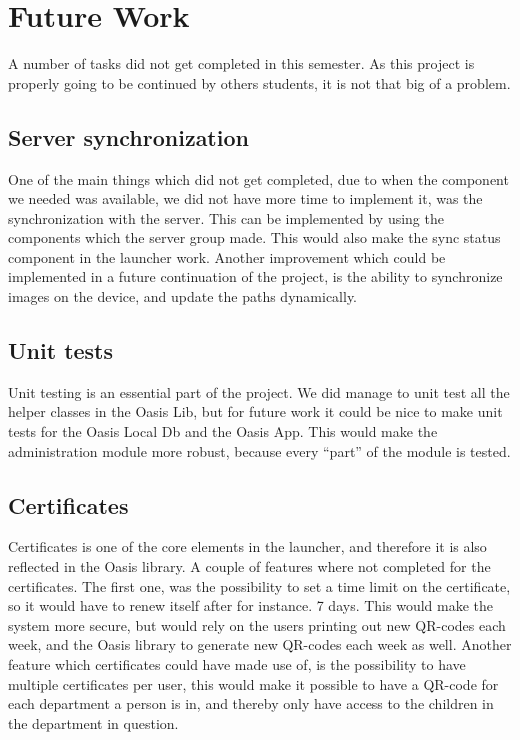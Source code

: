 \section{Future Work}

A number of tasks did not get completed in this semester. As this project is properly going to be continued by others students, it is not that big of a problem. 

\subsection{Server synchronization}
One of the main things which did not get completed, due to when the component we needed was available, we did not have more time to implement it, was the synchronization with the server. This can be implemented by using the components which the server group made. This would also make the sync status component in the launcher work.
Another improvement which could be implemented in a future continuation of the project, is the ability to synchronize images on the device, and update the paths dynamically.

\subsection{Unit tests}
Unit testing is an essential part of the project. We did manage to unit test all the helper classes in the Oasis Lib, but for future work it could be nice to make unit tests for the Oasis Local Db and the Oasis App. This would make the administration module more robust, because every "`part"' of the module is tested.

\subsection{Certificates}
Certificates is one of the core elements in the launcher, and therefore it is also reflected in the Oasis library. A couple of features where not completed for the certificates. The first one, was the possibility to set a time limit on the certificate, so it would have to renew itself after for instance. 7 days. This would make the system more secure, but would rely on the users printing out new QR-codes each week, and the Oasis library to generate new QR-codes each week as well.
Another feature which certificates could have made use of, is the possibility to have multiple certificates per user, this would make it possible to have a QR-code for each department a person is in, and thereby only have access to the children in the department in question.

